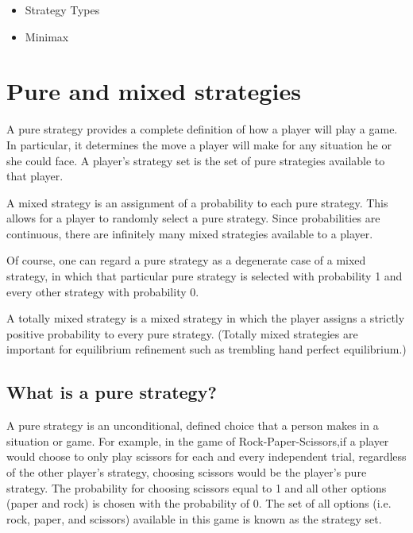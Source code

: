 \documentclass[a4paper,12pt]{article}
\begin{document}
\begin{framed}
\begin{multicols}{2}
\begin{itemize}
\item Strategy Types
\item Minimax 
\end{itemize}
\end{multicols}
\end{framed}


\section{Pure and mixed strategies}
A pure strategy provides a complete definition of how a player will play a game. In particular, it determines the move a player will make for any situation he or she could face. A player's strategy set is the set of pure strategies available to that player.

A mixed strategy is an assignment of a probability to each pure strategy. This allows for a player to randomly select a pure strategy. Since probabilities are continuous, there are infinitely many mixed strategies available to a player.

Of course, one can regard a pure strategy as a degenerate case of a mixed strategy, in which that particular pure strategy is selected with probability 1 and every other strategy with probability 0.

A totally mixed strategy is a mixed strategy in which the player assigns a strictly positive probability to every pure strategy. (Totally mixed strategies are important for equilibrium refinement such as trembling hand perfect equilibrium.)



\subsection{What is a pure strategy?}

A pure strategy is an unconditional, defined choice that a person makes in a situation or game. For example, in the game of Rock-Paper-Scissors,if a player would choose to only play scissors for each and every independent trial, regardless of the other player’s strategy, choosing scissors would be the player’s pure strategy. The probability for choosing scissors equal to 1 and all other options (paper and rock) is chosen with the probability of 0. The set of all options (i.e. rock, paper, and scissors) available in this game is known as the strategy set.
\end{document}
